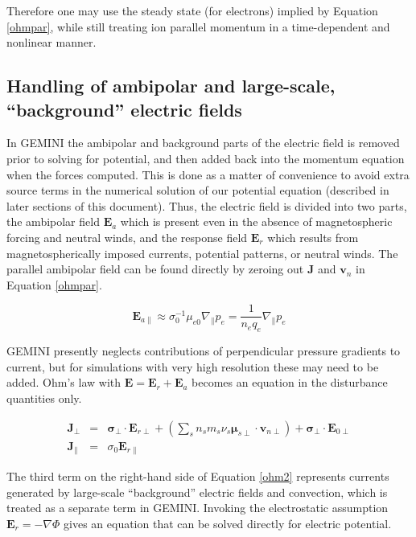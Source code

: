 \documentclass[11pt,letterpaper]{article}
\begin{document}
Therefore one may use the steady state (for electrons) implied by Equation \ref{ohmpar}, while still treating ion parallel momentum in a time-dependent and nonlinear manner.  


\subsection{Handling of ambipolar and large-scale, ``background'' electric fields}

In GEMINI the ambipolar and background parts of the electric field is removed prior to solving for potential, and then added back into the momentum equation when the forces computed.  This is done as a matter of convenience to avoid extra source terms in the numerical solution of our potential equation (described in later sections of this document).  Thus, the electric field is divided into two parts, the ambipolar field $\mathbf{E}_a$ which is present even in the absence of magnetospheric forcing and neutral winds, and the response field $\mathbf{E}_r$ which results from magnetospherically imposed currents, potential patterns, or neutral winds.  The parallel ambipolar field can be found directly by zeroing out $\mathbf{J}$ and $\mathbf{v}_n$ in Equation \ref{ohmpar}.  
\begin{linenomath*} \begin{equation}
\mathbf{E}_{a\parallel} \approx \sigma_0^{-1} \mu_{e0} \nabla_\parallel p_e = \frac{1}{n_e q_e} \nabla_\parallel p_e \label{Eambpar}
\end{equation} \end{linenomath*}
GEMINI presently neglects contributions of perpendicular pressure gradients to current, but for simulations with very high resolution these may need to be added.  Ohm's law with $\mathbf{E}=\mathbf{E}_r+\mathbf{E}_a$ becomes an equation in the disturbance quantities only.
\begin{linenomath*} \begin{eqnarray}
\mathbf{J}_\perp &=& \boldsymbol{\sigma}_\perp \cdot \mathbf{E}_{r\perp} + \left( \sum_s n_s m_s \nu_s \boldsymbol{\mu}_{s\perp} \cdot \mathbf{v}_{n\perp} \right) + \boldsymbol{\sigma}_\perp \cdot \mathbf{E}_{0\perp} \label{ohm2} \\
\mathbf{J}_\parallel &=& \sigma_0 \mathbf{E}_{r\parallel}
\end{eqnarray} \end{linenomath*}
The third term on the right-hand side of Equation \ref{ohm2} represents currents generated by large-scale ``background'' electric fields and convection, which is treated as a separate term in GEMINI.  Invoking the electrostatic assumption $\mathbf{E}_r = -\nabla \Phi$ gives an equation that can be solved directly for electric potential.
\end{document}
